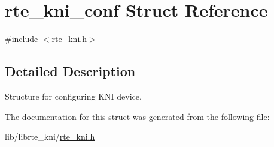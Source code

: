 \hypertarget{structrte__kni__conf}{}\section{rte\+\_\+kni\+\_\+conf Struct Reference}
\label{structrte__kni__conf}


{\ttfamily \#include $<$rte\+\_\+kni.\+h$>$}



\subsection{Detailed Description}
Structure for configuring K\+N\+I device. 

The documentation for this struct was generated from the following file\+:\begin{DoxyCompactItemize}
\item 
lib/librte\+\_\+kni/\hyperlink{rte__kni_8h}{rte\+\_\+kni.\+h}\end{DoxyCompactItemize}
